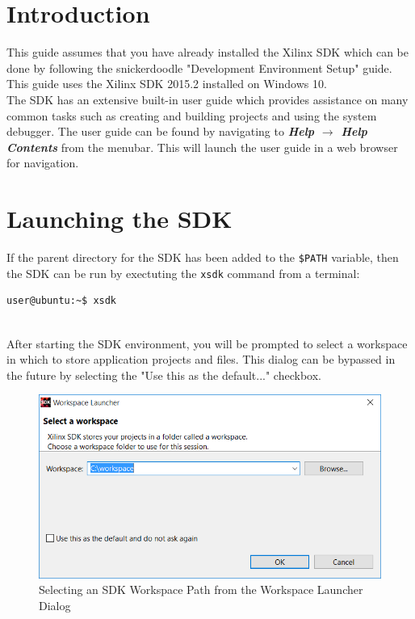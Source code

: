 \section{Introduction}


This guide assumes that you have already installed the Xilinx SDK which can be done by following the snickerdoodle "Development Environment Setup" guide. This guide uses the Xilinx SDK 2015.2 installed on Windows 10. \\


\noindent
The SDK has an extensive built-in user guide which provides assistance on many common tasks such as creating and building projects and using the system debugger. The user guide can be found by navigating to \textit{\bfseries Help $\rightarrow$ Help Contents} from the menubar. This will launch the user guide in a web browser for navigation.


\section{Launching the SDK}
If the parent directory for the SDK has been added to the \Verb|$PATH| variable, then the SDK can be run by exectuting the \texttt{xsdk} command from a terminal: \\

\begin{lstlisting}
user@ubuntu:~$ xsdk
\end{lstlisting}

~\\
\noindent
After starting the SDK environment, you will be prompted to select a workspace in which to store application projects and files. This dialog can be bypassed in the future by selecting the "Use this as the default..." checkbox. \\

\begin{figure}[h]
	\centering
	\includegraphics{images/Workspace_Selection.png}
	\caption{Selecting an SDK Workspace Path from the Workspace Launcher Dialog}
	\label{fig:workspacedialog}
\end{figure}


